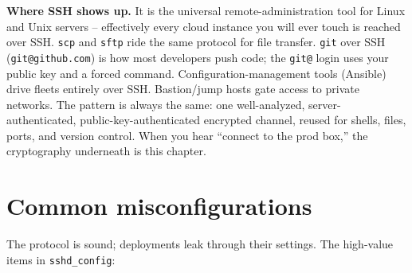 \begin{applicationbox}
\textbf{Where SSH shows up.} It is the universal remote-administration tool for Linux and Unix servers -- effectively every cloud instance you will ever touch is reached over SSH. \texttt{scp} and \texttt{sftp} ride the same protocol for file transfer. \texttt{git} over SSH (\texttt{git@github.com}) is how most developers push code; the \texttt{git@} login uses your public key and a forced command. Configuration-management tools (Ansible) drive fleets entirely over SSH. Bastion/jump hosts gate access to private networks. The pattern is always the same: one well-analyzed, server-authenticated, public-key-authenticated encrypted channel, reused for shells, files, ports, and version control. When you hear ``connect to the prod box,'' the cryptography underneath is this chapter.
\end{applicationbox}

\section{Common misconfigurations}

The protocol is sound; deployments leak through their settings. The high-value items in \texttt{sshd\_config}:

